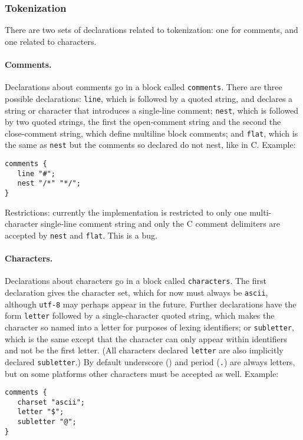 \subsubsection{Tokenization}
There are two sets of declarations related to tokenization: one for
comments, and one related to characters.

\paragraph{Comments.}
Declarations about comments go in a block called \texttt{comments}.
There are three possible declarations: \texttt{line}, which is
followed by a quoted string, and declares a string or
character that introduces a single-line comment; \texttt{nest}, which
is followed by two quoted strings, the first the open-comment string
and the second the close-comment string, which define multiline block
comments; and \texttt{flat}, which is the same as \texttt{nest} but
the comments so declared do not nest, like in C.
Example:
\begin{verbatim}
comments {
   line "#";
   nest "/*" "*/";
}
\end{verbatim}

Restrictions: currently the implementation is restricted to only one
multi-character single-line comment string and only the C comment
delimiters are accepted by \texttt{nest} and \texttt{flat}.
This is a bug. %

\paragraph{Characters.}
Declarations about characters go in a block called
\texttt{characters}.
The first declaration gives the character set, which for now must
always be \texttt{ascii}, although \texttt{utf-8} may perhaps appear
in the future.
Further declarations have the form \texttt{letter} followed by a
single-character quoted string, which makes the character so named
into a letter for purposes of lexing identifiers; or
\texttt{subletter}, which is the same except that the character can
only appear within identifiers and not be the first letter.
(All characters declared \texttt{letter} are also implicitly declared
\texttt{subletter}.)
By default underscore (\texttt{\us}) and period (\texttt{.}) are
always letters, but on some platforms other characters must be
accepted as well.
Example:
\begin{verbatim}
comments {
   charset "ascii";
   letter "$";
   subletter "@";
}
\end{verbatim}


